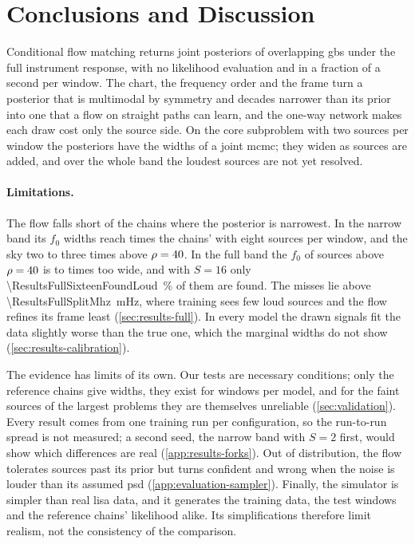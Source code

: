 \section{Conclusions and Discussion}
\label{sec:conclusions}

Conditional flow matching returns joint posteriors of overlapping \acp{gb} under the full
instrument response, with no likelihood evaluation and in a fraction of a second per window. The
chart, the frequency order and the frame turn a posterior that is multimodal by symmetry and
decades narrower than its prior into one that a flow on straight paths can learn, and the one-way
network makes each draw cost only the source side. On the core subproblem with two sources per
window the posteriors have the widths of a joint \ac{mcmc}; they widen as sources are added, and
over the whole band the loudest sources are not yet resolved.

\paragraph{Limitations.}
\label{sec:limitations}
The flow falls short of the chains where the posterior is narrowest. In the narrow band its $f_0$
widths reach \ResultsNarrowEightFzeroLow{} times the chains' with eight sources per window, and the
sky two to three times above $\rho=40$. In the full band the $f_0$ of sources above $\rho=40$ is
\ResultsFullFourFzeroLoud{} to \ResultsFullSixteenFzeroLoud{} times too wide, and with $S=16$ only
\qty{\ResultsFullSixteenFoundLoud}{\percent} of them are found. The misses lie above
\qty{\ResultsFullSplitMhz}{\milli\hertz}, where training sees few loud sources and the flow refines
its frame least (\cref{sec:results-full}). In every model the drawn signals fit the data slightly
worse than the true one, which the marginal widths do not show (\cref{sec:results-calibration}).

The evidence has limits of its own. Our tests are necessary conditions; only the reference chains
give widths, they exist for \EvaluationInjections{} windows per model, and for the faint sources of
the largest problems they are themselves unreliable (\cref{sec:validation}). Every result comes from
one training run per configuration, so the run-to-run spread is not measured; a second seed, the
narrow band with $S=2$ first, would show which differences are real (\cref{app:results-forks}).
Out of distribution, the flow tolerates sources past its prior but turns confident and wrong when
the noise is louder than its assumed \ac{psd} (\cref{app:evaluation-sampler}). Finally, the
simulator is simpler than real \ac{lisa} data, and it generates the training data, the test windows
and the reference chains' likelihood alike. Its simplifications therefore limit realism, not the
consistency of the comparison.

